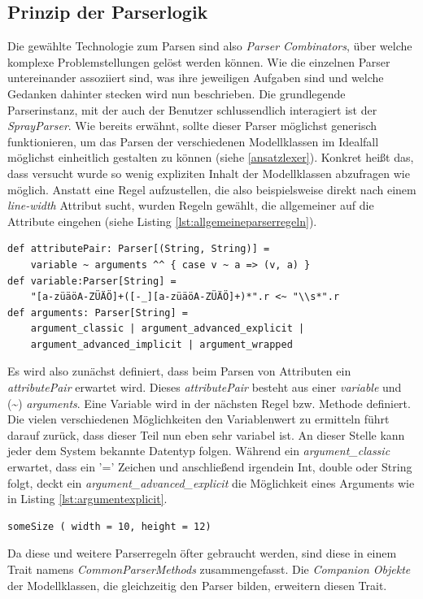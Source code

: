 \subsection{Prinzip der Parserlogik}Die gewählte Technologie zum Parsen sind also \textit{Parser Combinators}, über welche komplexe Problemstellungen gelöst werden können. Wie die einzelnen Parser untereinander assoziiert sind, was ihre jeweiligen Aufgaben sind und welche Gedanken dahinter stecken wird nun beschrieben.
Die grundlegende Parserinstanz, mit der auch der Benutzer schlussendlich interagiert ist der \textit{SprayParser}. Wie bereits erwähnt, sollte dieser Parser möglichst generisch funktionieren, um das Parsen der verschiedenen Modellklassen im Idealfall möglichst einheitlich gestalten zu können (siehe \ref{ansatzlexer}). Konkret heißt das, dass versucht wurde so wenig expliziten Inhalt der Modellklassen abzufragen wie möglich. Anstatt eine Regel aufzustellen, die also beispielsweise direkt nach einem \textit{line-width} Attribut sucht, wurden Regeln gewählt, die allgemeiner auf die Attribute eingehen (siehe Listing \ref{lst:allgemeineparserregeln}).
\begin{lstlisting}[style=scala, caption = {Auszug aus Code beispielhafte Regeln, die verallgemeinerte Attribut- Wert Tupel parsen}, label = {lst:allgemeineparserregeln}]
def attributePair: Parser[(String, String)] = 
	variable ~ arguments ^^ { case v ~ a => (v, a) }
def variable:Parser[String] =
    "[a-züäöA-ZÜÄÖ]+([-_][a-züäöA-ZÜÄÖ]+)*".r <~ "\\s*".r
def arguments: Parser[String] =
    argument_classic | argument_advanced_explicit | 
    argument_advanced_implicit | argument_wrapped
\end{lstlisting}
Es wird also zunächst definiert, dass beim Parsen von Attributen ein \textit{attributePair} erwartet wird. Dieses \textit{attributePair} besteht aus einer \textit{variable} und (\textasciitilde) \textit{arguments}. Eine Variable wird in der nächsten Regel bzw. Methode definiert.
Die vielen verschiedenen Möglichkeiten den Variablenwert zu ermitteln führt darauf zurück, dass dieser Teil nun eben sehr variabel ist. An dieser Stelle kann jeder dem System bekannte Datentyp folgen. Während ein \textit{argument\_classic} erwartet, dass ein '=' Zeichen und anschließend irgendein Int, double oder String folgt, deckt ein \textit{argument\_advanced\_explicit} die Möglichkeit eines Arguments wie in Listing \ref{lst:argumentexplicit}.
\begin{lstlisting}[style=scala, aboveskip=0pt, caption = {Beispiel für eine Attributsdefinition mit expliziter Parameterbenennung}, label = {lst:argumentexplicit}]
someSize ( width = 10, height = 12)
\end{lstlisting}Da diese und weitere Parserregeln öfter gebraucht werden, sind diese in einem Trait namens \textit{CommonParserMethods} zusammengefasst. Die \textit{Companion Objekte} der Modellklassen, die gleichzeitig den Parser bilden, erweitern diesen Trait.
